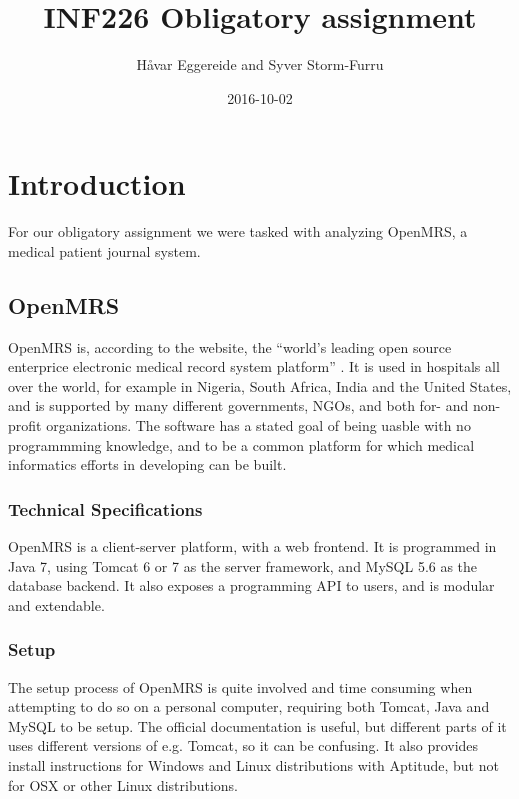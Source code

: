 \documentclass{article}
\title{INF226 Obligatory assignment}
\date{2016-10-02}
\author{Håvar Eggereide and Syver Storm-Furru}
\begin{document}
\maketitle
{}
\newpage
{}
\tableofcontents
\newpage
\section{Introduction}

  For our obligatory assignment we were tasked with analyzing OpenMRS, a medical
  patient journal system.

\subsection{OpenMRS}

  OpenMRS is, according to the website, the ``world's leading open source
  enterprice electronic medical record system platform'' \autocite[]{OpenMRSAbout}. It is used in
  hospitals all over the world, for example in Nigeria, South Africa, India
  and the United States, and is supported by many different governments, NGOs,
  and both for- and non-profit organizations. The software has a stated goal of
  being uasble with no programmming knowledge, and to be a common platform for
  which medical informatics efforts in developing can be built.

  \subsubsection{Technical Specifications}

  OpenMRS is a client-server platform, with a web frontend. It is programmed in
  Java 7, using Tomcat 6 or 7 as the server framework, and MySQL 5.6 as the
  database backend. It also exposes a programming API to users, and is modular
  and extendable.

\subsubsection{Setup}

  The setup process of OpenMRS is quite involved and time consuming when
  attempting to do so on a personal computer, requiring both Tomcat, Java and
  MySQL to be setup. The official documentation is useful, but different parts
  of it uses different versions of e.g. Tomcat, so it can be confusing.
  It also provides install instructions for Windows and Linux distributions
  with Aptitude, but not for OSX or other Linux distributions. 
\end{document}

